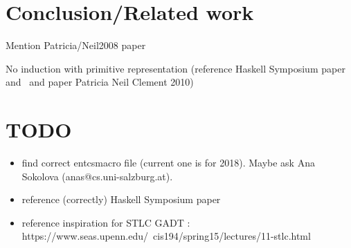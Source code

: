 \documentclass[9pt]{entcs}
\begin{document}




\section{Conclusion/Related work}

Mention Patricia/Neil2008 paper

No induction with primitive representation (reference Haskell Symposium paper and~\cite{jp19} and paper Patricia Neil Clement 2010)


\section{TODO}

\begin{itemize}
\item find correct entcsmacro file (current one is for 2018). Maybe ask Ana Sokolova (anas@cs.uni-salzburg.at).
\item reference (correctly) Haskell Symposium paper
\item reference inspiration for STLC GADT : https://www.seas.upenn.edu/~cis194/spring15/lectures/11-stlc.html
\end{itemize}
\end{document}
